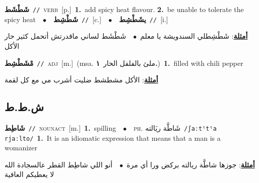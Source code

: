 \documentclass[10pt,a4paper,twoside]{article} %
\begin{document}
\begin{multicols}{2}
{\setlength\topsep{0pt}\textbf{\foreignlanguage{arabic}{شَطْشَط}}\ {\color{gray}\texttt{//}\color{black}}\ \textsc{verb}\ [p.]\ \textbf{1.}~add spicy heat flavour.  \textbf{2.}~be unable to tolerate the spicy heat\ \ $\bullet$\ \ \setlength\topsep{0pt}\textbf{\foreignlanguage{arabic}{شَطْشِط}}\ {\color{gray}\texttt{//}\color{black}}\ [c.]\ \ $\bullet$\ \ \setlength\topsep{0pt}\textbf{\foreignlanguage{arabic}{يشَطْشِط}}\ {\color{gray}\texttt{//}\color{black}}\ [i.]\  \begin{flushright}\color{gray}\foreignlanguage{arabic}{\textbf{\underline{\foreignlanguage{arabic}{أمثلة}}}: شَطْشِطلي السندويشة يا معلم\ $\bullet$\ \  شَطْشَط لساني ماقدرتش أتحمل كثير حار الأكل}\end{flushright}\color{black}} \vspace{2mm}

{\setlength\topsep{0pt}\textbf{\foreignlanguage{arabic}{مْشَطْشِط}}\ {\color{gray}\texttt{//}\color{black}}\ \textsc{adj}\ [m.]\ \color{gray}(msa. \foreignlanguage{arabic}{ملئ بالفلفل الحار}~\foreignlanguage{arabic}{\textbf{١.}})\color{black}\ \textbf{1.}~filled with chili pepper\  \begin{flushright}\color{gray}\foreignlanguage{arabic}{\textbf{\underline{\foreignlanguage{arabic}{أمثلة}}}: الأكل مشطشط ضليت أشرب مي مع كل لقمة}\end{flushright}\color{black}} \vspace{2mm}

\vspace{-3mm}
\subsection*{\color{blue}\foreignlanguage{arabic}{ش.ط.ط}\color{blue}{}} 

{\setlength\topsep{0pt}\textbf{\foreignlanguage{arabic}{شَاطِط}}\ {\color{gray}\texttt{//}\color{black}}\ \textsc{noun\textunderscore act}\ [m.]\ \textbf{1.}~spilling\ \ $\bullet$\ \ \textsc{ph.} \color{gray} \foreignlanguage{arabic}{شَاطَّة ريَالته}\color{black}\ {\color{gray}\texttt{/{\sffamily ʃaːtˤtˤa rjaːlto}/}\color{black}}\ \textbf{1.}~It is an idiomatic expression that means that a man is a womanizer\  \begin{flushright}\color{gray}\foreignlanguage{arabic}{\textbf{\underline{\foreignlanguage{arabic}{أمثلة}}}: جوزها شاطَّة ريالته بركض ورا أي مرة\ $\bullet$\ \  أنو اللي شاطِط القطر عالسجادة الله لا يعطيكم العافية}\end{flushright}\color{black}} \vspace{2mm}


\end{multicols}
\end{document}
